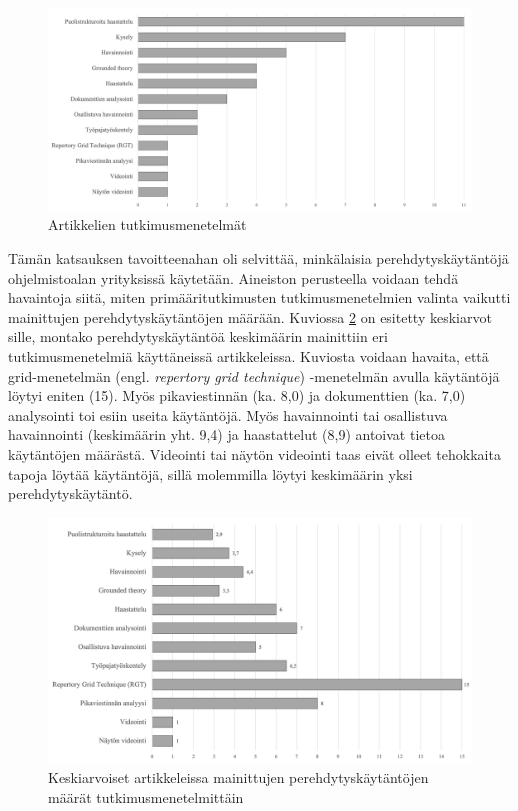 \documentclass[utf8]{gradu3}
\begin{document}
\begin{figure}[h]
    \centering
    \includegraphics[width=\textwidth]{media/menetelmat.png}
    \caption{Artikkelien tutkimusmenetelmät}
    \label{kuvio:tutkimusmenetelmat}
\end{figure}

Tämän katsauksen tavoitteenahan oli selvittää, minkälaisia perehdytyskäytäntöjä ohjelmistoalan yrityksissä käytetään. Aineiston perusteella voidaan tehdä havaintoja siitä, miten primääritutkimusten tutkimusmenetelmien valinta vaikutti mainittujen perehdytyskäytäntöjen määrään. Kuviossa \ref{kuvio:menetelmilla-havaitut-kaytannot} on esitetty keskiarvot sille, montako perehdytyskäytäntöä keskimäärin mainittiin eri tutkimusmenetelmiä käyttäneissä artikkeleissa. Kuviosta voidaan havaita, että grid-menetelmän (engl. \textit{repertory grid technique}) -menetelmän avulla käytäntöjä löytyi eniten (15). Myös pikaviestinnän (ka. 8,0) ja dokumenttien (ka. 7,0) analysointi toi esiin useita käytäntöjä. Myös havainnointi tai osallistuva havainnointi (keskimäärin yht. 9,4) ja haastattelut (8,9) antoivat tietoa käytäntöjen määrästä. Videointi tai näytön videointi taas eivät olleet tehokkaita tapoja löytää käytäntöjä, sillä molemmilla löytyi keskimäärin yksi perehdytyskäytäntö.

\begin{figure}[h]
    \centering
    \includegraphics[width=\textwidth]{media/menetelmilla-havaitut-kaytannot.png}
    \caption{Keskiarvoiset artikkeleissa mainittujen perehdytyskäytäntöjen määrät tutkimusmenetelmittäin}
    \label{kuvio:menetelmilla-havaitut-kaytannot}
\end{figure}
\end{document}
